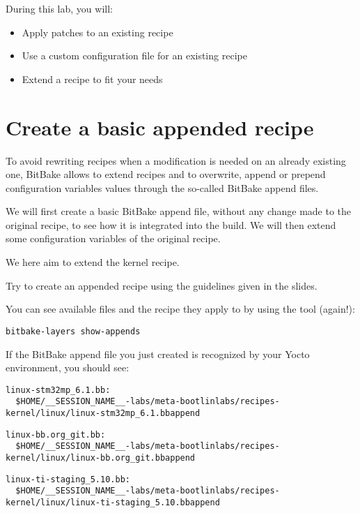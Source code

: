 
During this lab, you will:
\begin{itemize}
  \item Apply patches to an existing recipe
  \item Use a custom configuration file for an existing recipe
  \item Extend a recipe to fit your needs
\end{itemize}

\section{Create a basic appended recipe}

To avoid rewriting recipes when a modification is needed on an already existing
one, BitBake allows to extend recipes and to overwrite, append or prepend
configuration variables values through the so-called BitBake append files.

We will first create a basic BitBake append file, without any change made
to the original recipe, to see how it is integrated into the build. We will then
extend some configuration variables of the original recipe.

We here aim to extend the 
{{}} kernel recipe.

Try to create an appended recipe using the guidelines given in the slides.

You can see available  files and the recipe they apply to by
using the  tool (again!):
\begin{verbatim}
bitbake-layers show-appends
\end{verbatim}

If the BitBake append file you just created is recognized by your Yocto
environment, you should see:
\if{}
\begin{verbatim}
linux-stm32mp_6.1.bb:
  $HOME/__SESSION_NAME__-labs/meta-bootlinlabs/recipes-kernel/linux/linux-stm32mp_6.1.bbappend
\end{verbatim}
\else
  \if{}
\begin{verbatim}
linux-bb.org_git.bb:
  $HOME/__SESSION_NAME__-labs/meta-bootlinlabs/recipes-kernel/linux/linux-bb.org_git.bbappend
\end{verbatim}
  \else
\begin{verbatim}
linux-ti-staging_5.10.bb:
  $HOME/__SESSION_NAME__-labs/meta-bootlinlabs/recipes-kernel/linux/linux-ti-staging_5.10.bbappend
\end{verbatim}
  \fi
\fi

